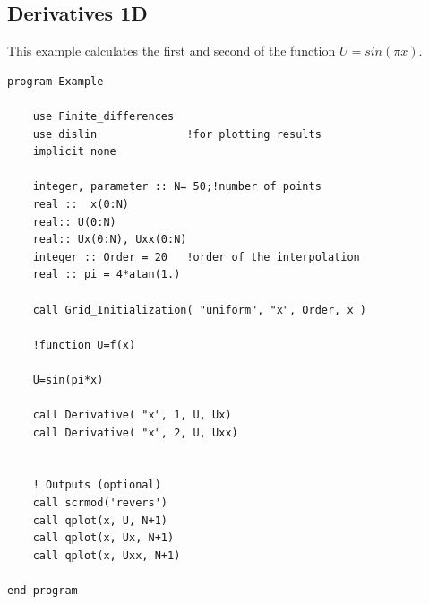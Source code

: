 


\subsection{ Derivatives 1D}

This example calculates the first and second  of the function
$U=sin(\pi x)$. \\

\begin{blueframed}
\begin{lstlisting}
program Example

	use Finite_differences
	use dislin   			!for plotting results
	implicit none
	
  	integer, parameter :: N= 50;!number of points
  	real ::  x(0:N)
	real:: U(0:N)
	real:: Ux(0:N), Uxx(0:N)
	integer :: Order = 20	!order of the interpolation
	real :: pi = 4*atan(1.) 

	call Grid_Initialization( "uniform", "x", Order, x )
	
	!function U=f(x)
	
	U=sin(pi*x)
	
	call Derivative( "x", 1, U, Ux) 
	call Derivative( "x", 2, U, Uxx) 


	! Outputs (optional)
	call scrmod('revers') 
	call qplot(x, U, N+1)
	call qplot(x, Ux, N+1)
	call qplot(x, Uxx, N+1)

end program
\end{lstlisting}
\end{blueframed}

